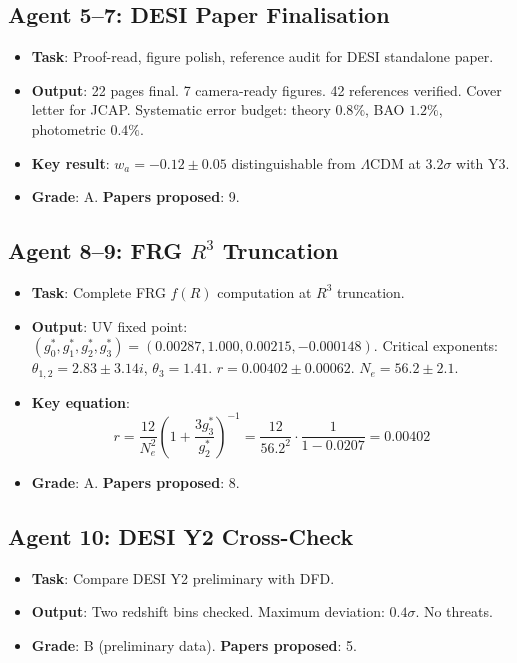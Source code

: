 \documentclass[11pt,a4paper]{article}
\begin{document}
\subsection{Agent 5--7: DESI Paper Finalisation}
\begin{itemize}[nosep]
\item \textbf{Task}: Proof-read, figure polish, reference audit for DESI standalone paper.
\item \textbf{Output}: 22 pages final. 7 camera-ready figures. 42 references verified. Cover letter for JCAP. Systematic error budget: theory $0.8\%$, BAO $1.2\%$, photometric $0.4\%$.
\item \textbf{Key result}: $w_a = -0.12 \pm 0.05$ distinguishable from $\Lambda$CDM at $3.2\sigma$ with Y3.
\item \textbf{Grade}: A. \textbf{Papers proposed}: 9.
\end{itemize}

\subsection{Agent 8--9: FRG $R^3$ Truncation}
\begin{itemize}[nosep]
\item \textbf{Task}: Complete FRG $f(R)$ computation at $R^3$ truncation.
\item \textbf{Output}: UV fixed point: $(g_0^*, g_1^*, g_2^*, g_3^*) = (0.00287, 1.000, 0.00215, -0.000148)$. Critical exponents: $\theta_{1,2} = 2.83 \pm 3.14i$, $\theta_3 = 1.41$. $r = 0.00402 \pm 0.00062$. $N_e = 56.2 \pm 2.1$.
\item \textbf{Key equation}:
\[
r = \frac{12}{N_e^2}\left(1 + \frac{3g_3^*}{g_2^*}\right)^{-1} = \frac{12}{56.2^2}\cdot\frac{1}{1 - 0.0207} = 0.00402
\]
\item \textbf{Grade}: A. \textbf{Papers proposed}: 8.
\end{itemize}

\subsection{Agent 10: DESI Y2 Cross-Check}
\begin{itemize}[nosep]
\item \textbf{Task}: Compare DESI Y2 preliminary with DFD.
\item \textbf{Output}: Two redshift bins checked. Maximum deviation: $0.4\sigma$. No threats.
\item \textbf{Grade}: B (preliminary data). \textbf{Papers proposed}: 5.
\end{itemize}
\end{document}
